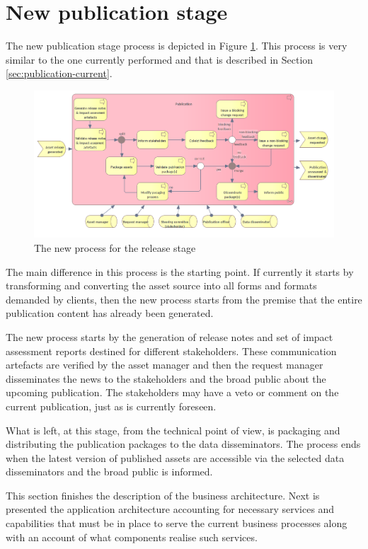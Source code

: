 	\section{New publication stage}
	\label{sec:publication-new}
	
	The new publication stage process is depicted in Figure \ref{fig:publication-new}. This process is very similar to the one currently performed and that is described in Section \ref{sec:publication-current}.
	
	\begin{figure}[h]
		\centering
		\includegraphics[width=1.05\textwidth]{images/business/new/Publication.png}
		\caption{The new process for the release stage}
		\label{fig:publication-new}
	\end{figure}

	The main difference in this process is the starting point. If currently it starts by transforming and converting the asset source into all forms and formats demanded by clients, then the new process starts from the premise that the entire publication content has already been generated. 
	
	The new process starts by the generation of release notes and set of impact assessment reports destined for different stakeholders. These communication artefacts are verified by the asset manager and then the request manager disseminates the news to the stakeholders and the broad public about the upcoming publication. The stakeholders may have a veto or comment on the current publication, just as is currently foreseen.   
	
	What is left, at this stage, from the technical point of view, is packaging and distributing the publication packages to the data disseminators. The process ends when the latest version of published assets are accessible via the selected data disseminators and the broad public is informed. 
	
	This section finishes the description of the business architecture. Next is presented the application architecture accounting for necessary services and capabilities that must be in place to serve the current business processes along with an account of what components realise such services. 
	
